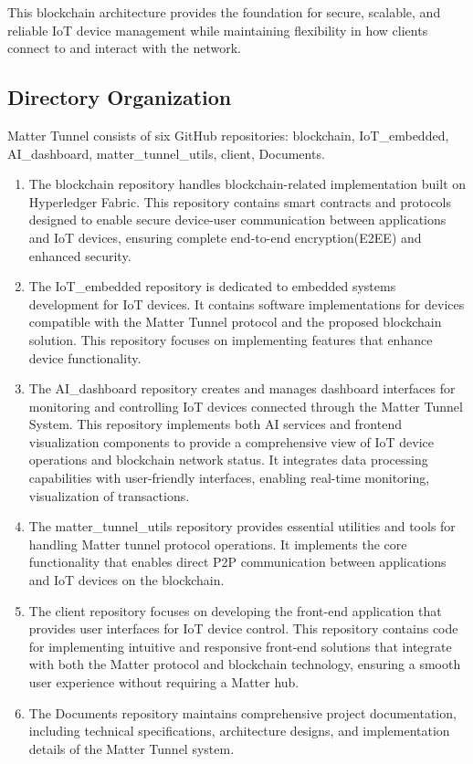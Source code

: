 \documentclass[conference]{IEEEtran}
\begin{document}
This blockchain architecture provides the foundation for secure, scalable, and reliable IoT device management while maintaining flexibility in how clients connect to and interact with the network.


\subsection{Directory Organization}

Matter Tunnel consists of six GitHub repositories: blockchain, IoT\_embedded, AI\_dashboard, matter\_tunnel\_utils, client, Documents.

\begin{enumerate}[itemsep=2ex, parsep=1ex]
	\item The blockchain repository handles blockchain-related implementation built on Hyperledger Fabric. This repository contains smart contracts and protocols designed to enable secure device-user communication between applications and IoT devices, ensuring complete end-to-end encryption(E2EE) and enhanced security.
	      	      	          
	\item The IoT\_embedded repository is dedicated to embedded systems development for IoT devices. It contains software implementations for devices compatible with the Matter Tunnel protocol and the proposed blockchain solution. This repository focuses on implementing features that enhance device functionality.
	      	      	          
	\item The AI\_dashboard repository creates and manages dashboard interfaces for monitoring and controlling IoT devices connected through the Matter Tunnel System. This repository implements both AI services and frontend visualization components to provide a comprehensive view of IoT device operations and blockchain network status. It integrates data processing capabilities with user-friendly interfaces, enabling real-time monitoring, visualization of transactions.
	      	      	          
	\item The matter\_tunnel\_utils repository provides essential utilities and tools for handling Matter tunnel protocol operations. It implements the core functionality that enables direct P2P communication between applications and IoT devices on the blockchain.
	      	      	          
	\item The client repository focuses on developing the front-end application that provides user interfaces for IoT device control. This repository contains code for implementing intuitive and responsive front-end solutions that integrate with both the Matter protocol and blockchain technology, ensuring a smooth user experience without requiring a Matter hub.
	      	      	          
	\item The Documents repository maintains comprehensive project documentation, including technical specifications, architecture designs, and implementation details of the Matter Tunnel system.
\end{enumerate}
\end{document}
